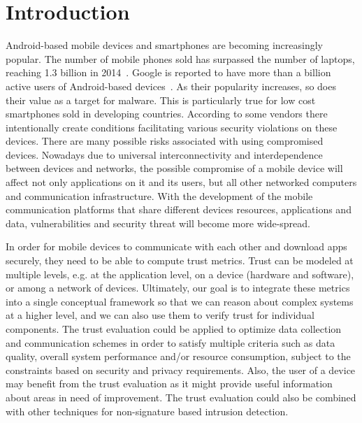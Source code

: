 \section{Introduction}

Android-based mobile devices and smartphones are becoming increasingly popular.  The number of mobile phones
sold has surpassed the number of laptops, reaching 1.3 billion in 
2014~\cite{market}.  Google is 
reported to have more than a billion active users of 
Android-based devices~\cite{android-users}.  
As their popularity increases, so does their value as
a target for malware.  
This is particularly true for low cost smartphones sold in developing countries. According to \cite{zheng2014droidray}
some vendors there intentionally create conditions facilitating various security violations on these devices.
 There are many possible risks associated with using compromised devices.  Nowadays due to universal interconnectivity and 
interdependence between devices and networks, the 
possible compromise of a mobile device will affect not only applications on it and its users, but all other 
networked computers and communication infrastructure.
With the development of the mobile communication platforms that share different devices resources, applications and data, 
vulnerabilities and security threat will become more wide-spread. 

In order for mobile devices to communicate with each other and download apps securely,
they need to be able to compute trust metrics.   Trust can be modeled at 
multiple levels, e.g. at the application level, on a device (hardware and software), or among a network of devices.  Ultimately, our goal
is to integrate these metrics into a single conceptual framework so that we can reason about complex systems at a  
higher level, and we can also use them to verify trust for individual components.
The trust evaluation  could 
be applied to optimize data collection and communication schemes in order to satisfy multiple criteria such as 
data quality, overall
system performance and/or resource consumption, subject to the constraints based on security and privacy requirements.
Also, the user of a device may benefit from the trust evaluation as it might 
provide useful information about areas in need of improvement. The trust evaluation could also be combined with other techniques for
 non-signature based intrusion detection.


